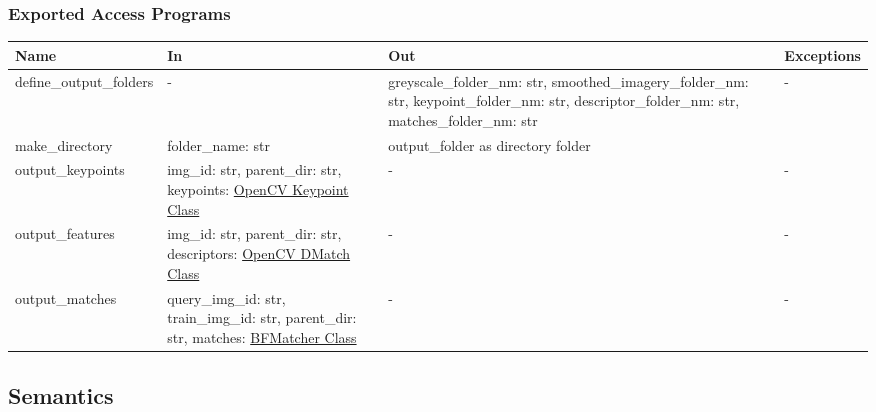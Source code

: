 \documentclass[12pt, titlepage]{article}
\begin{document}
\subsubsection{Exported Access Programs}

\begin{center}
  \begin{tabular}{p{4cm} p{4cm} p{5cm} p{2cm}}
  \hline
  \textbf{Name} & \textbf{In} & \textbf{Out} & \textbf{Exceptions} \\
  \hline
  define\_output\_folders
  & - 
  & greyscale\_folder\_nm: str, \newline
  smoothed\_imagery\_folder\_nm: str, \newline
  keypoint\_folder\_nm: str, \newline
  descriptor\_folder\_nm: str, \newline
  matches\_folder\_nm: str
  & - \\
  \hline
  make\_directory
  & folder\_name: str
  & output\_folder as directory folder \\
  \hline
  output\_keypoints 
  & img\_id: str, \newline
  parent\_dir: str, \newline
  keypoints: \href{https://docs.opencv.org/3.4/d2/d29/classcv_1_1KeyPoint.html}{OpenCV Keypoint Class}
  & -  
  & - \\
  \hline
  output\_features 
  & img\_id: str, \newline
  parent\_dir: str, \newline
  descriptors: \href{https://docs.opencv.org/3.4/d4/de0/classcv_1_1DMatch.html}{OpenCV DMatch Class}
  & - 
  & - \\
  \hline
  output\_matches 
  & query\_img\_id: str, \newline
  train\_img\_id: str, \newline
  parent\_dir: str, \newline
  matches: \href{https://docs.opencv.org/3.4/d3/da1/classcv_1_1BFMatcher.html}{BFMatcher Class}
  & - 
  & - \\
  \hline
  \end{tabular}
  \end{center}
  
  \subsection{Semantics}
  
\end{document}
